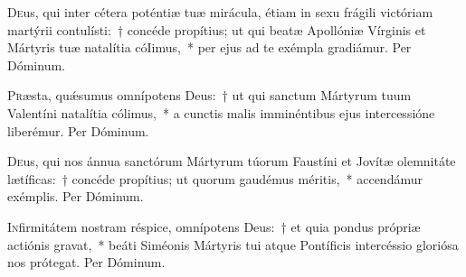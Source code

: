 \documentclass[vesperale_romanum.tex]{subfiles}
\begin{document}

\oratio

\lettrine{D}{e}us, qui inter cétera poténtiæ tuæ mirácula, étiam in sexu frágili vi\-ctóriam martýrii contulísti:~† concéde propítius; ut qui beatæ Apollóniæ Vírginis et Mártyris tuæ natalítia cóIimus,~* per ejus ad te exémpla gradiámur. Per Dóminum.

\capitdeseqquad

\myrule


\oratio

\lettrine{P}{r}æsta, quǽsumus omnípotens Deus:~† ut qui san\-ctum Mártyrum tuum Valentíni natalítia cólimus,~* a cun\-ctis malis imminéntibus ejus intercessióne liberémur. Per Dóminum.

\myrule


\oratio

\lettrine{D}{e}us, qui nos ánnua san\-ctórum Mártyrum túorum Faustíni et Jovítæ ole\-mnitáte lætíficas:~† concéde propítius; ut quorum gaudémus méritis,~* accendámur exémplis. Per Dóminum.

\myrule


\oratio

\lettrine{I}{n}firmitátem nostram réspice, omnípotens Deus:~† et quia pondus própriæ actiónis gravat,~* beáti Siméonis Mártyris tui atque Pontíficis intercéssio gloriósa nos prótegat. Per Dóminum.

\myrule


\duplexmajus



\myrule


\duplexmtv

\end{document}
